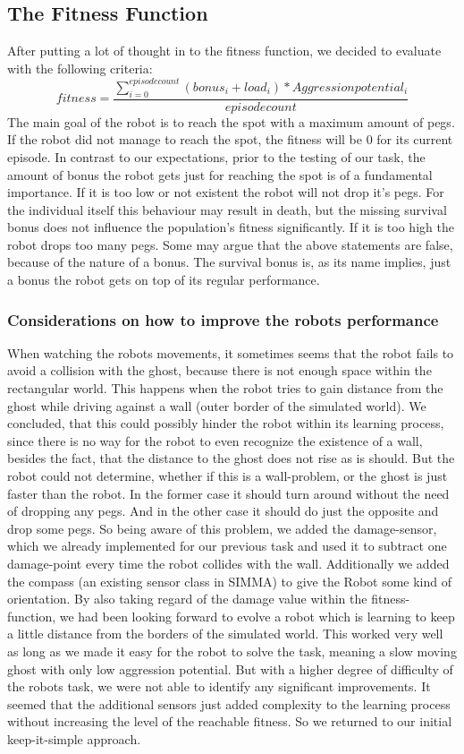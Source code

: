 \documentclass[12pt,fleqn,a4paper]{article}
\begin{document}
\subsection{The Fitness Function}
After putting a lot of thought in to the fitness function, we decided to evaluate with the following criteria:
\[ fitness = \frac{\sum_{i=0}^{episodecount} (bonus_i + load_i)*Aggressionpotential_i}{episodecount} \]
The main goal of the robot is to reach the spot with a maximum amount of pegs. 
If the robot did not manage to reach the spot, the fitness will be 0 for its current episode.
In contrast to our expectations, prior to the testing of our task, the amount of bonus the robot gets just for reaching the spot is of a fundamental importance. If it is too low or not existent the robot will not drop it's pegs. For the individual itself this behaviour may result in death, but the missing survival bonus does not influence the population's fitness significantly. If it is too high the robot drops too many pegs. Some may argue that the above statements are false, because of the nature of a bonus.
The survival bonus is, as its name implies, just a bonus the robot gets on top of its regular performance.

\subsubsection{Considerations on how to improve the robots performance}
When watching the robots movements, it sometimes seems that the robot fails to avoid a collision with the ghost, because there is not enough space within the rectangular world. This happens when the robot tries to gain distance from the ghost while driving against a wall (outer border of the simulated world). We concluded, that this could possibly hinder the robot within its learning process, since there is no way for the robot to even recognize the existence of a wall, besides the fact, that the distance to the ghost does not rise as is should. But the robot could not determine, whether if this is a wall-problem, or the ghost is just faster than the robot. In the former case it should turn around without the need of dropping any pegs. And in the other case it should do just the opposite and drop some pegs. So being aware of this problem, we added the damage-sensor, which we already implemented for our previous task and used it to subtract one damage-point every time the robot collides with the wall. Additionally we added the compass (an existing sensor class in SIMMA) to give the Robot some kind of orientation. By also taking regard of the damage value within the fitness-function, we had been looking forward to evolve a robot which is learning to keep a little distance from the borders of the simulated world. This worked very well as long as we made it easy for the robot to solve the task, meaning a slow moving ghost with only low aggression potential. But with a higher degree of difficulty of the robots task, we were not able to identify any significant improvements. It seemed that the additional sensors just added complexity to the learning process without increasing the level of the reachable fitness. So we returned to our initial keep-it-simple approach.
\end{document}
